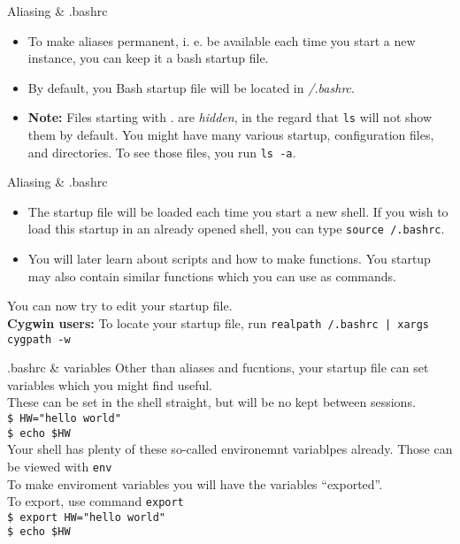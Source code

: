 \documentclass{beamer}
\let\tt\texttt
\let\bf\textbf
\let\it\itshape
\let\tilde\texttildelow
\begin{document}
\begin{frame}{Aliasing \& .bashrc}
        \begin{itemize}
                \item To make aliases permanent, i. e. be available each time you start a new instance, you can keep it a bash startup file.
                \item By default, you Bash startup file will be located in {\it{\tilde}/.bashrc}.
                \item \bf{Note:} Files starting with . are {\it hidden}, in the regard that \tt{ls} will not show them by default. You might have many various startup, configuration files, and directories. To see those files, you run \tt{ls -a}.
        \end{itemize}
\end{frame}

\begin{frame}{Aliasing \& .bashrc}
        \begin{itemize}
                \item The startup file will be loaded each time you start a new shell. If you wish to load this startup in an already opened shell, you can type \tt{source {\tilde}/.bashrc}.
                \item You will later learn about scripts and how to make functions. You startup may also contain similar functions which you can use as commands.
        \end{itemize}
        You can now try to edit your startup file. \\
        \bf{Cygwin users:} To locate your startup file, run \tt{realpath {\tilde}/.bashrc | xargs cygpath -w}
\end{frame}

\begin{frame}{.bashrc \& variables}
        Other than aliases and fucntions, your startup file can set variables which you might find useful. \\
        These can be set in the shell straight, but will be no kept between sessions. \\
        \tt{\$ HW="hello world"}    \\
        \tt{\$ echo \$HW}           \\
        Your shell has plenty of these so-called environemnt variablpes already. Those can be viewed with \tt{env}   \\
        To make enviroment variables you will have the variables ``exported''. \\
        To export, use command \tt{export} \\
        \tt{\$ export HW="hello world"}    \\
        \tt{\$ echo \$HW}           \\
\end{frame}
\end{document}
